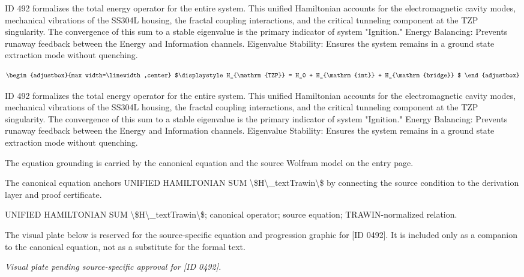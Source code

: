 ID 492 formalizes the total energy operator for the entire system. This unified Hamiltonian accounts for the electromagnetic cavity modes, mechanical vibrations of the SS304L housing, the fractal coupling interactions, and the critical tunneling component at the TZP singularity. The convergence of this sum to a stable eigenvalue is the primary indicator of system "Ignition." Energy Balancing: Prevents runaway feedback between the Energy and Information channels. Eigenvalue Stability: Ensures the system remains in a ground state extraction mode without quenching.

\[
\begin{adjustbox}{max width=\linewidth,center}
$\displaystyle
H_{\mathrm{TZP}} = H_0 + H_{\mathrm{int}} + H_{\mathrm{bridge}}
$
\end{adjustbox}
\]

ID 492 formalizes the total energy operator for the entire system. This unified Hamiltonian accounts for the electromagnetic cavity modes, mechanical vibrations of the SS304L housing, the fractal coupling interactions, and the critical tunneling component at the TZP singularity. The convergence of this sum to a stable eigenvalue is the primary indicator of system "Ignition." Energy Balancing: Prevents runaway feedback between the Energy and Information channels. Eigenvalue Stability: Ensures the system remains in a ground state extraction mode without quenching.

The equation grounding is carried by the canonical equation and the source Wolfram model on the entry page.

The canonical equation anchors UNIFIED HAMILTONIAN SUM \textbackslash{}\$H\textbackslash{}\_textTrawin\textbackslash{}\$ by connecting the source condition to the derivation layer and proof certificate.

UNIFIED HAMILTONIAN SUM \textbackslash{}\$H\textbackslash{}\_textTrawin\textbackslash{}\$; canonical operator; source equation; TRAWIN-normalized relation.
\endgroup

\begingroup\footnotesize\sloppy
The visual plate below is reserved for the source-specific equation and progression graphic for [ID 0492]. It is included only as a companion to the canonical equation, not as a substitute for the formal text.
\par\endgroup
\begingroup\footnotesize\itshape
Visual plate pending source-specific approval for [ID 0492].
\par\endgroup


